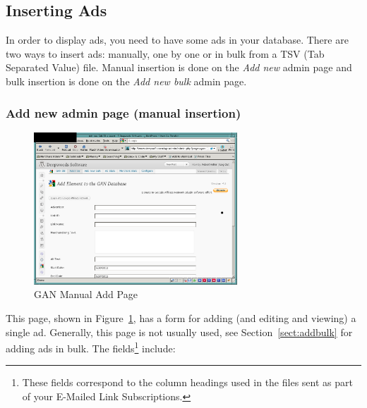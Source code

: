\documentclass[letterpaper]{article}
\begin{document}
\subsection{Inserting Ads}

In order to display ads, you need to have some ads in your database.
There are two ways to insert ads: manually, one by one or in bulk from
a TSV (Tab Separated Value) file. Manual insertion is done on the
\emph{Add new} admin page and bulk insertion is done on the
\emph{Add new bulk} admin page.

\subsubsection{Add new admin page (manual insertion)}

\begin{figure}[ht]
\begin{centering}
\includegraphics[width=3in]{ganmanualadd.png}
\caption{GAN Manual Add Page}
\label{fig:manualadd}
\end{centering}
\end{figure}
This page, shown in Figure~\ref{fig:manualadd}, has a form for adding
(and editing and viewing) a single ad. Generally, this page is not
usually used, see Section~\ref{sect:addbulk} for adding ads in bulk.
The fields\footnote{These fields correspond to the column headings used
in the files sent as part of your E-Mailed Link Subscriptions.}
include: 
\end{document}
